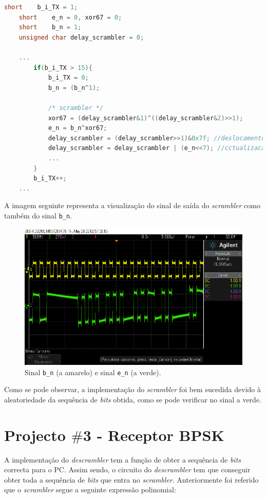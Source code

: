 \documentclass[11pt]{article}
\numberwithin{equation}{section}
\begin{document}
\begin{lstlisting}[language=C]
	short    b_i_TX = 1;
	short    e_n = 0, xor67 = 0;
	short    b_n = 1;
	unsigned char delay_scrambler = 0;
	
	...
		if(b_i_TX > 15){
			b_i_TX = 0;
			b_n = (b_n^1);
			 
			/* scrambler */
			xor67 = (delay_scrambler&1)^((delay_scrambler&2)>>1);
			e_n = b_n^xor67;
			delay_scrambler = (delay_scrambler>>1)&0x7f; //deslocamento temporal
			delay_scrambler = delay_scrambler | (e_n<<7); //cctualizacao do novo valor de e_n no vector
			...
		}
		b_i_TX++;	
	...
\end{lstlisting}

A imagem seguinte representa a visualização do sinal de saída do \textit{scrambler} como também do sinal \texttt{b\_n}.

\begin{figure}[H]
	\centering
	\includegraphics[keepaspectratio=true, scale=0.40]{exps/ScramblerBnVsEn}
	\caption{Sinal \texttt{b\_n} (a amarelo) e sinal \texttt{e\_n} (a verde).}
	\vspace{-0.8em}
\end{figure}

Como se pode observar, a implementação do \textit{scrambler} foi bem sucedida devido à aleatoriedade da sequência de \textit{bits} obtida, como se pode verificar no sinal a verde. 

\pagebreak

\section{Projecto $\#$3 - Receptor BPSK}

A implementação do \textit{descrambler} tem a função de obter a sequência de \textit{bits} correcta para o PC. Assim sendo, o circuito do \textit{descrambler} tem que conseguir obter toda a sequência de \textit{bits} que entra no \textit{scrambler}.
Anteriormente foi referido que o \textit{scrambler} segue a seguinte expressão polinomial:
\end{document}
